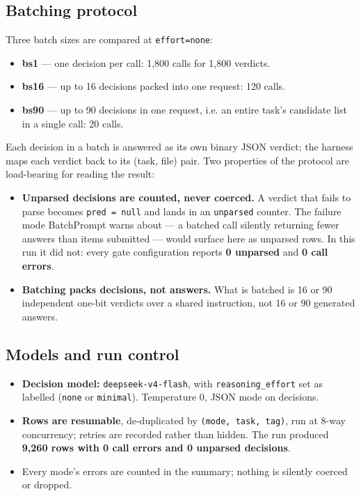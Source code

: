 \documentclass[10pt]{article}
\begin{document}
\subsection{Batching protocol}

Three batch sizes are compared at \texttt{effort=none}:

\begin{itemize}
\item \textbf{bs1} --- one decision per call: 1,800 calls for 1,800 verdicts.
\item \textbf{bs16} --- up to 16 decisions packed into one request: 120 calls.
\item \textbf{bs90} --- up to 90 decisions in one request, i.e. an entire task's candidate list in a single call: 20 calls.
\end{itemize}

Each decision in a batch is answered as its own binary JSON verdict; the harness maps each verdict back to its (task, file) pair. Two properties of the protocol are load-bearing for reading the result:

\begin{itemize}
\item \textbf{Unparsed decisions are counted, never coerced.} A verdict that fails to parse becomes \texttt{pred = null} and lands in an \texttt{unparsed} counter. The failure mode BatchPrompt warns about --- a batched call silently returning fewer answers than items submitted --- would surface here as unparsed rows. In this run it did not: every gate configuration reports \textbf{0 unparsed} and \textbf{0 call errors}.
\item \textbf{Batching packs decisions, not answers.} What is batched is 16 or 90 independent one-bit verdicts over a shared instruction, not 16 or 90 generated answers.
\end{itemize}

\subsection{Models and run control}

\begin{itemize}
\item \textbf{Decision model:} \texttt{deepseek-v4-flash}, with \texttt{reasoning\_effort} set as labelled (\texttt{none} or \texttt{minimal}). Temperature 0, JSON mode on decisions.
\item \textbf{Rows are resumable}, de-duplicated by \texttt{(mode, task, tag)}, run at 8-way concurrency; retries are recorded rather than hidden. The run produced \textbf{9,260 rows with 0 call errors and 0 unparsed decisions}.
\item Every mode's errors are counted in the summary; nothing is silently coerced or dropped.
\end{itemize}
\end{document}
